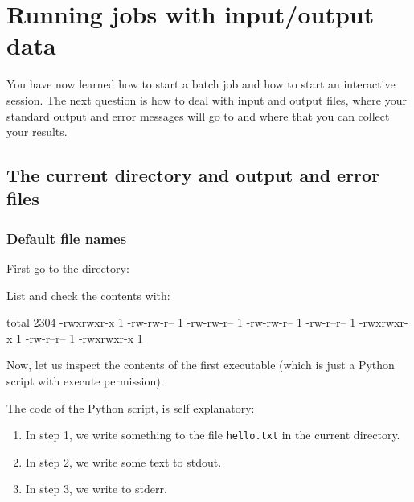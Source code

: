 \chapter{Running jobs with input/output data}
\label{ch:running-jobs-with-input-output-data}

You have now learned how to start a batch job and how to start an interactive
session.  The next question is how to deal with input and output files, where
your standard output and error messages will go to and where that you can
collect your results.

\section{The current directory and output and error files}

\subsection{Default file names}

First go to the directory:

\begin{prompt}
\end{prompt}

List and check the contents with:

\begin{prompt}
total 2304
-rwxrwxr-x 1 %
-rw-rw-r-- 1 %
-rw-rw-r-- 1 %
-rw-rw-r-- 1 %
-rw-r--r-- 1 %
-rwxrwxr-x 1 %
-rw-r--r-- 1 %
-rwxrwxr-x 1 %
\end{prompt}

Now, let us inspect the contents of the first executable (which is just a
Python script with execute permission).


The code of the Python script, is self explanatory:
\begin{enumerate}
\item  In step 1, we write something to the file \texttt{hello.txt} in the current directory.
\item  In step 2, we write some text to stdout.
\item  In step 3, we write to stderr.
\end{enumerate}

